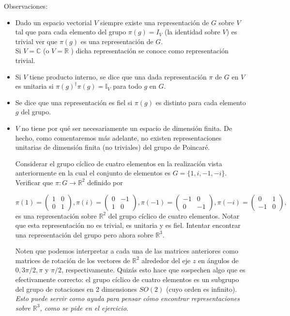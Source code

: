 Observaciones:
\begin{itemize}
    \item[i)] Dado un espacio vectorial $V$ siempre existe una representación de $G$ sobre $V$ tal que para cada elemento del grupo $\pi(g)= I_{V}$ (la identidad sobre $V$) es trivial ver que $\pi(g)$ es una representación de $G$.\\
    Si $V=\mathbb{C}$ (o $V=\mathbb{R}$ ) dicha representación se conoce como representación trivial.
    \item[ii)] Si $V$ tiene producto interno, se dice que una dada representación $\pi$ de $G$ en $V$ es unitaria si $\pi(g)^{\dagger} \pi(g)=\mathbb{I}_{V}$ para todo $g$ en $G$.
    \item[iii)] Se dice que una representación es fiel si $\pi(g)$ es distinto para cada elemento $g$ del grupo.
    \item[iv)] $V$ no tiene por qué ser necesariamente un espacio de dimensión finita. De hecho, como comentaremos más adelante, no existen representaciones unitarias de dimensión finita (no triviales) del grupo de Poincaré.
    
\begin{exercise}
    Considerar el grupo cíclico de cuatro elementos en la realización vista anteriormente en la cual el conjunto de elementos es $G=\{1, i,-1,-i\}$. Verificar que $\pi: G \rightarrow \mathbb{R}^{2}$ definido por 
    
    \begin{equation}
     \pi(1)=\left(\begin{array}{ll}1 & 0 \\ 0 & 1\end{array}\right), \pi(i)=\left(\begin{array}{cc}0 & -1 \\ 1 & 0\end{array}\right), \pi(-1)=\left(\begin{array}{cc}-1 & 0 \\ 0 & -1\end{array}\right), \pi(-i)=\left(\begin{array}{cc}0 & 1 \\ -1 & 0\end{array}\right),   
    \end{equation}
es una representación sobre $\mathbb{R}^{2}$ del grupo cíclico de cuatro elementos. Notar que esta representación no es trivial, es unitaria y es fiel. Intentar encontrar una representación del grupo pero ahora sobre $\mathbb{R}^{3}$.
\end{exercise}
Noten que podemos interpretar a cada una de las matrices anteriores como matrices de rotación de los vectores de $\mathbb{R}^{2}$ alrededor del eje $z$ en ángulos de $0,3 \pi / 2, \pi$ y $\pi / 2$, respectivamente. Quizás esto hace que sospechen algo que es efectivamente correcto: el grupo cíclico de cuatro elementos es un subgrupo del grupo de rotaciones en 2 dimensiones $S O(2)$ (cuyo orden es infinito). \emph{Esto puede servir como ayuda para pensar cómo encontrar representaciones sobre $\mathbb{R}^{3}$, como se pide en el ejercicio}.
\end{itemize}


